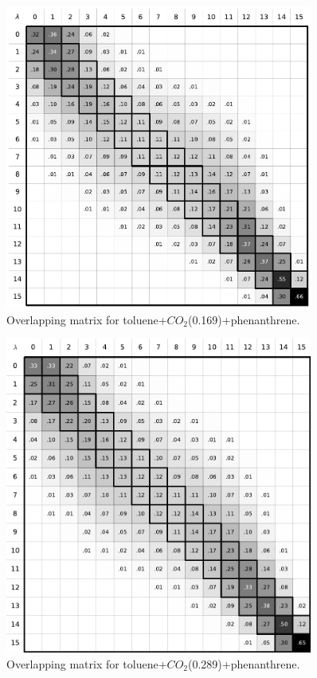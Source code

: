 \documentclass[
	12pt,				%
	openright,			%
	oneside,			%
	a4paper,			%
	english,			%
	brazil				%
	]{abntex2}
\begin{document}
\begin{apendicesenv}
\begin{figure}[H]
	\centering
	\includegraphics[width=0.9\textwidth]{Figures/otolco2_3}
	\caption{Overlapping matrix for toluene+$CO_{2}$(0.169)+phenanthrene.}
\end{figure}

\begin{figure}[H]
	\centering
	\includegraphics[width=0.9\textwidth]{Figures/otolco2_4}
	\caption{Overlapping matrix for toluene+$CO_{2}$(0.289)+phenanthrene.}
\end{figure}


\end{apendicesenv}
\end{document}
